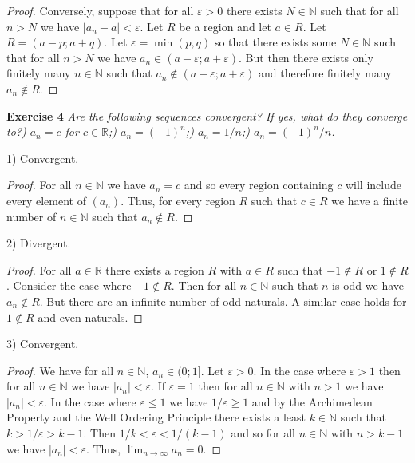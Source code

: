 \documentclass{article}
\begin{document}
\begin{flushleft}
\begin{proof}
Conversely, suppose that for all $\varepsilon > 0$ there exists $N \in \mathbb{N}$ such that for all $n > N$ we have $|a_n - a| < \varepsilon$. Let $R$ be a region and let $a \in R$. Let $R=(a-p;a+q)$. Let $\varepsilon = \min (p,q)$ so that there exists some $N \in \mathbb{N}$ such that for all $n > N$ we have $a_n \in (a - \varepsilon ; a + \varepsilon)$. But then there exists only finitely many $n \in \mathbb{N}$ such that $a_n \notin (a - \varepsilon ; a + \varepsilon)$ and therefore finitely many $a_n \notin R$.
\end{proof}

\textbf{Exercise 4}
\textsl{Are the following sequences convergent? If yes, what do they converge to?) $a_n=c$ for $c \in \mathbb{R}$;) $a_n=(-1)^n$;) $a_n=1/n$;) $a_n=(-1)^n/n$.}\newline

1) Convergent.
\begin{proof}
For all $n \in \mathbb{N}$ we have $a_n = c$ and so every region containing $c$ will include every element of $(a_n)$. Thus, for every region $R$ such that $c \in R$ we have a finite number of $n \in \mathbb{N}$ such that $a_n \notin R$.
\end{proof}

2) Divergent.
\begin{proof}
For all $a \in \mathbb{R}$ there exists a region $R$ with $a \in R$ such that $-1 \notin R$ or $1 \notin R$. Consider the case where $-1 \notin R$. Then for all $n \in \mathbb{N}$ such that $n$ is odd we have $a_n \notin R$. But there are an infinite number of odd naturals. A similar case holds for $1 \notin R$ and even naturals.
\end{proof}

3) Convergent.
\begin{proof}
We have for all $n \in \mathbb{N}$, $a_n \in (0;1]$. Let $\varepsilon > 0$. In the case where $\varepsilon > 1$ then for all $n \in \mathbb{N}$ we have $|a_n| < \varepsilon$. If $\varepsilon = 1$ then for all $n \in \mathbb{N}$ with $n > 1$ we have $|a_n| < \varepsilon$. In the case where $\varepsilon \leq 1$ we have $1/\varepsilon \geq 1$ and by the Archimedean Property and the Well Ordering Principle there exists a least $k \in \mathbb{N}$ such that $k > 1/\varepsilon > k-1$. Then $1/k < \varepsilon < 1/(k-1)$ and so for all $n \in \mathbb{N}$ with $n>k-1$ we have $|a_n| < \varepsilon$. Thus, $\lim_{n \rightarrow \infty} a_n = 0$.
\end{proof}


\end{flushleft}
\end{document}
